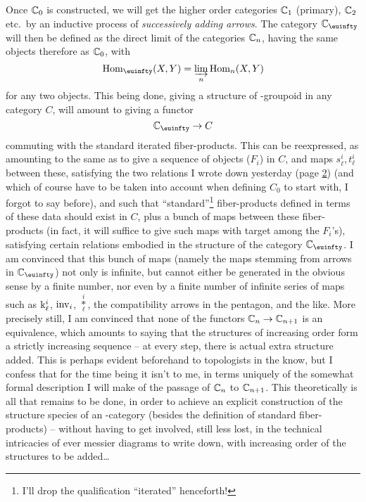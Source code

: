 Once ${\mathbb{C}}_0$ is constructed, we will get the higher order
categories ${\mathbb{C}}_1$ (primary), ${\mathbb{C}}_2$ etc.\ by an inductive
process of \emph{successively adding arrows}. The category $\bC_\oo$
will then be defined as the direct limit of the categories
${\mathbb{C}}_n$, having the same objects therefore as ${\mathbb{C}}_0$, with
\[\Hom_\oo(X, Y) = \varinjlim_n \Hom_n(X, Y)\]
for any two objects. This being done, giving a structure of
\oo-groupoid in any category $C$, will amount to giving a functor
\[\bC_\oo \to C\]
commuting with the standard iterated fiber-products. This can be
reexpressed, as amounting to the same as to give a sequence of objects
($F_i$) in $C$, and maps $s_\ell^i, t_\ell^i$ between these,
satisfying the two relations I wrote down yesterday (page \hyperref[p:L.2]2) (and
which of course have to be taken into account when defining $C_0$ to
start with, I forgot to say before), and such that
``standard''\footnote{I'll drop the qualification ``iterated''
  henceforth!} fiber-products defined in terms of these data should
exist in $C$, plus a bunch of maps between these fiber-products (in
fact, it will suffice to give such maps with target among the
$F_i$'s), satisfying certain relations embodied in the structure of
the category $\bC_\oo$. I am convinced that this bunch of maps
(namely the maps stemming from arrows in $\bC_\oo$) not only is
infinite, but cannot either be generated in the obvious
sense by a finite number, nor even by a finite number of infinite
series of maps such as $\mathrm{k}_\ell^i$, $\operatorname{inv}_i$,
$\overset{i}{\underset{\ell}{*}}$, the compatibility arrows in the
pentagon, and the like. More precisely still, I am convinced that none
of the functors ${\mathbb{C}}_n \to {\ensuremath{\mathbb{C}}}_{n+1}$ is an equivalence, which
amounts to saying that the structures of increasing order form a
strictly increasing sequence -- at every step, there is actual extra
structure added. This is perhaps evident beforehand to topologists in
the know, but I confess that for the time being it isn't to me, in
terms uniquely of the somewhat formal description I will make of the
passage of ${\mathbb{C}}_n$ to ${\mathbb{C}}_{n+1}$. This theoretically is all
that remains to be done, in order to achieve an explicit construction
of the structure species of an \oo-category (besides the definition of
standard fiber-products) -- without having to get involved, still less
lost, in the technical intricacies of ever messier diagrams to write
down, with increasing order of the structures to be added\ldots

